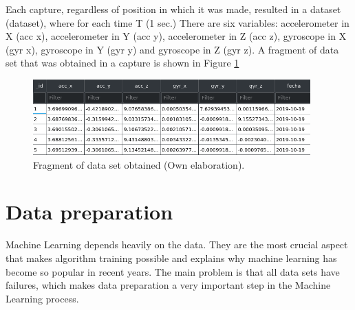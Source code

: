 Each capture, regardless of position in which it was made, resulted in a dataset (dataset), where for each time T (1 sec.) There are six variables: accelerometer in X (acc x), accelerometer in Y (acc y), accelerometer in Z (acc z), gyroscope in X (gyr x), gyroscope in Y (gyr y) and gyroscope in Z (gyr z). A fragment of data set that was obtained in a capture is shown in Figure \ref{fig:dataset}

\begin{figure}[h!]
  \begin{center}	\includegraphics[width=0.95\textwidth,frame]{imagenes/Cap3/dataset}
  \caption{Fragment of data set obtained (Own elaboration).}
  \label{fig:dataset}
  \end{center}
\end{figure}

\section{Data preparation}

Machine Learning depends heavily on the data. They are the most crucial aspect that makes algorithm training possible and explains why machine learning has become so popular in recent years. The main problem is that all data sets have failures, which makes data preparation a very important step in the Machine Learning process.

